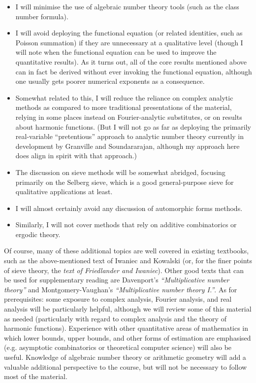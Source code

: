 \documentclass[10pt,reqno]{amsart}
\begin{document}
\begin{itemize}
    \item I will minimise the use of algebraic number theory tools (such as the class number formula).
    \item I will avoid deploying the functional equation (or related identities, such as Poisson summation) if they are unnecessary at a qualitative level (though I will note when the functional equation can be used to improve the quantitative results). As it turns out, all of the core results mentioned above can in fact be derived without ever invoking the functional equation, although one usually gets poorer numerical exponents as a consequence.
    \item Somewhat related to this, I will reduce the reliance on complex analytic methods as compared to more traditional presentations of the material, relying in some places instead on Fourier-analytic substitutes, or on results about harmonic functions. (But I will not go as far as deploying the primarily real-variable “pretentious” approach to analytic number theory currently in development by Granville and Soundararajan, although my approach here does align in spirit with that approach.)
    \item The discussion on sieve methods will be somewhat abridged, focusing primarily on the Selberg sieve, which is a good general-purpose sieve for qualitative applications at least.
    \item I will almost certainly avoid any discussion of automorphic forms methods.
    \item Similarly, I will not cover methods that rely on additive combinatorics or ergodic theory.
\end{itemize}
%
Of course, many of these additional topics are well covered in existing textbooks, such as the above-mentioned text of Iwaniec and Kowalski (or, for the finer points of sieve theory, the \emph{text of Friedlander and Iwaniec}). Other good texts that can be used for supplementary reading are Davenport’s \emph{``Multiplicative number theory''} and Montgomery-Vaughan’s \emph{``Multiplicative number theory I.''}. As for prerequisites: some exposure to complex analysis, Fourier analysis, and real analysis will be particularly helpful, although we will review some of this material as needed (particularly with regard to complex analysis and the theory of harmonic functions). Experience with other quantitative areas of mathematics in which lower bounds, upper bounds, and other forms of estimation are emphasised (e.g. asymptotic combinatorics or theoretical computer science) will also be useful. Knowledge of algebraic number theory or arithmetic geometry will add a valuable additional perspective to the course, but will not be necessary to follow most of the material.
\end{document}
